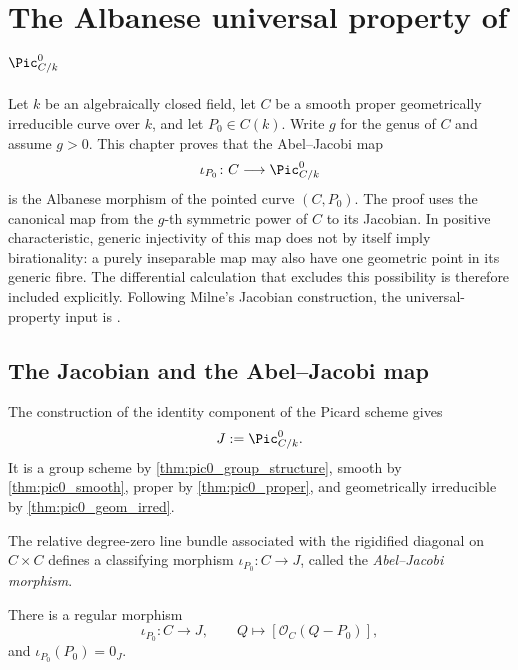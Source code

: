\chapter{The Albanese universal property of \(\Pic^0_{C/k}\)}
\label{chap:Albanese_AlbaneseUP}

Let \(k\) be an algebraically closed field, let \(C\) be a smooth proper
geometrically irreducible curve over \(k\), and let \(P_0\in C(k)\).  Write
\(g\) for the genus of \(C\) and assume \(g>0\).  This chapter proves that
the Abel--Jacobi map
\[
  \iota_{P_0}\colon C\longrightarrow \Pic^0_{C/k}
\]
is the Albanese morphism of the pointed curve \((C,P_0)\).  The proof uses
the canonical map from the \(g\)-th symmetric power of \(C\) to its
Jacobian.  In positive characteristic, generic injectivity of this map does
not by itself imply birationality: a purely inseparable map may also have
one geometric point in its generic fibre.  The differential calculation
that excludes this possibility is therefore included explicitly.
Following Milne's Jacobian construction, the universal-property input is
\cite{milne-av}.

\section{The Jacobian and the Abel--Jacobi map}
\label{sec:albaneseup_setup}

The construction of the identity component of the Picard scheme gives
\[
  J:=\Pic^0_{C/k}.
\]
It is a group scheme by \cref{thm:pic0_group_structure}, smooth by
\cref{thm:pic0_smooth}, proper by \cref{thm:pic0_proper}, and geometrically
irreducible by \cref{thm:pic0_geom_irred}.

\begin{definition}
  \label{def:abel_jacobi_morphism}

  The relative degree-zero line bundle associated with the rigidified
  diagonal on \(C\times C\) defines a classifying morphism
  \(\iota_{P_0}\colon C\to J\), called the \emph{Abel--Jacobi morphism}.
\end{definition}

\begin{lemma}
  \label{lem:abel_jacobi_morphism}

  There is a regular morphism
  \[
    \iota_{P_0}\colon C\longrightarrow J,
    \qquad Q\longmapsto [\mathcal O_C(Q-P_0)],
  \]
  and \(\iota_{P_0}(P_0)=0_J\).
\end{lemma}

